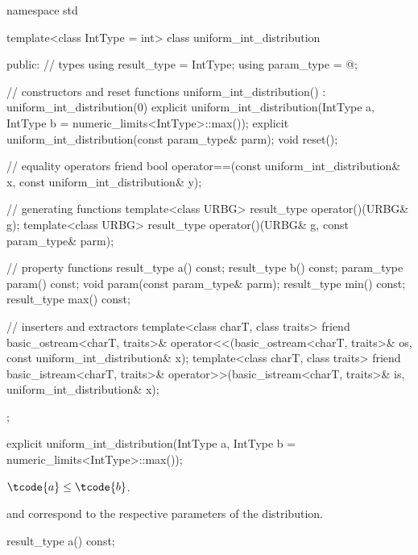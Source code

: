 %
%
\begin{codeblock}
namespace std {
  template<class IntType = int>
  class uniform_int_distribution {
  public:
    // types
    using result_type = IntType;
    using param_type  = @\unspec@;

    // constructors and reset functions
    uniform_int_distribution() : uniform_int_distribution(0) {}
    explicit uniform_int_distribution(IntType a, IntType b = numeric_limits<IntType>::max());
    explicit uniform_int_distribution(const param_type& parm);
    void reset();

    // equality operators
    friend bool operator==(const uniform_int_distribution& x, const uniform_int_distribution& y);

    // generating functions
    template<class URBG>
      result_type operator()(URBG& g);
    template<class URBG>
      result_type operator()(URBG& g, const param_type& parm);

    // property functions
    result_type a() const;
    result_type b() const;
    param_type param() const;
    void param(const param_type& parm);
    result_type min() const;
    result_type max() const;

    // inserters and extractors
    template<class charT, class traits>
      friend basic_ostream<charT, traits>&
        operator<<(basic_ostream<charT, traits>& os, const uniform_int_distribution& x);
    template<class charT, class traits>
      friend basic_istream<charT, traits>&
        operator>>(basic_istream<charT, traits>& is, uniform_int_distribution& x);
  };
}
\end{codeblock}


%
\begin{itemdecl}
explicit uniform_int_distribution(IntType a, IntType b = numeric_limits<IntType>::max());
\end{itemdecl}

\begin{itemdescr}
\pnum
\expects
$\tcode{a} \leq \tcode{b}$.

\pnum
\remarks
  and 
 correspond to the respective parameters of the distribution.
\end{itemdescr}

%
\begin{itemdecl}
result_type a() const;
\end{itemdecl}

